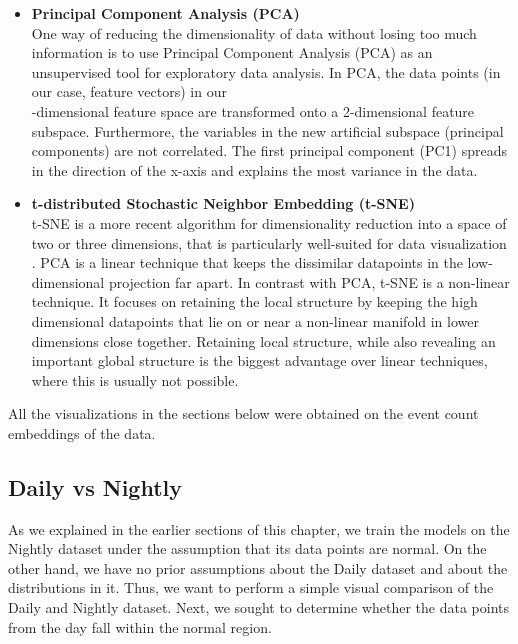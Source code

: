 \begin{itemize}
    \item \textbf{Principal Component Analysis (PCA)} \\
    One way of reducing the dimensionality of data without losing too much information is to use Principal Component Analysis (PCA) as an unsupervised tool for exploratory data analysis. 
    In PCA, the data points (in our case, feature vectors) in our\\ \featureVectorLength-dimensional feature space are transformed onto a 2-dimensional feature subspace. Furthermore, the variables in the new artificial subspace (principal components) are not correlated. The first principal component (PC1) spreads in the direction of the x-axis and explains the most variance in the data.
    
    \item \textbf{t-distributed Stochastic Neighbor Embedding (t-SNE)}\\
    t-SNE is a more recent algorithm for dimensionality reduction into a space of two or three dimensions, that is particularly well-suited for data visualization \cite{tsne}. PCA is a linear technique that keeps the dissimilar datapoints in the low-dimensional projection far apart. In contrast with PCA, t-SNE is a non-linear technique. It focuses on retaining the local structure by keeping the high dimensional datapoints that lie on or near a non-linear manifold in lower dimensions close together. Retaining local structure, while also revealing an important global structure is the biggest advantage over linear techniques, where this is usually not possible.
    
\end{itemize}

All the visualizations in the sections below were obtained on the event count embeddings of the data.  

\subsection{Daily vs Nightly}

As we explained in the earlier sections of this chapter, we train the models on the Nightly dataset under the assumption that its data points are normal. On the other hand, we have no prior assumptions about the Daily dataset and about the distributions in it. Thus, we want to perform a simple visual comparison of the Daily and Nightly dataset. Next, we sought to determine whether the data points from the day fall within the normal region.

